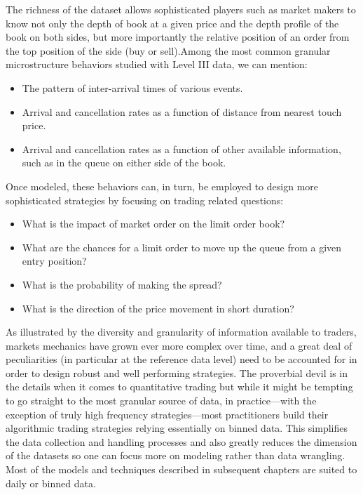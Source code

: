 The richness of the dataset allows sophisticated players such as market makers to know not only the depth of book at a given price and the depth profile of the book on both sides, but more importantly the relative position of an order from the top position of the side (buy or sell).Among the most common granular microstructure behaviors studied with Level III data, we can mention:
        \begin{itemize}
        \item The pattern of inter-arrival times of various events.
        \item Arrival and cancellation rates as a function of distance from nearest touch price.
        \item Arrival and cancellation rates as a function of other available information, such as in the queue on either side of the book.
        \end{itemize}
Once modeled, these behaviors can, in turn, be employed to design more sophisticated strategies by focusing on trading related questions:
        \begin{itemize}
        \item What is the impact of market order on the limit order book?
        \item What are the chances for a limit order to move up the queue from a given entry position?
        \item What is the probability of making the spread?
        \item What is the direction of the price movement in short duration?
        \end{itemize}


As illustrated by the diversity and granularity of information available to traders, markets mechanics have grown ever more complex over time, and a great deal of peculiarities (in particular at the reference data level) need to be accounted for in order to design robust and well performing strategies. The proverbial devil is in the details when it comes to quantitative trading but while it might be tempting to go straight to the most granular source of data, in practice---with the exception of truly high frequency strategies---most practitioners build their algorithmic trading strategies relying essentially on binned data. This simplifies the data collection and handling processes and also greatly reduces the dimension of the datasets so one can focus more on modeling rather than data wrangling. Most of the models and techniques described in subsequent chapters are suited to daily or binned data.



